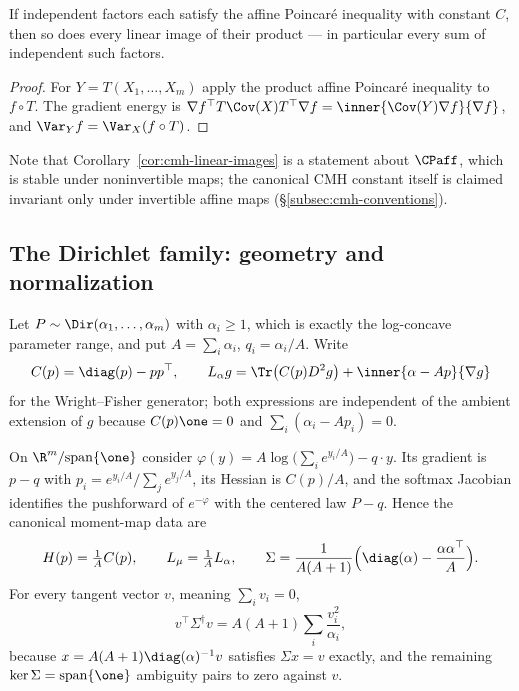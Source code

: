 \documentclass[../../main.tex]{subfiles}
\begin{document}
\begin{corollary}
\label{cor:cmh-linear-images}
If independent factors each satisfy the affine Poincar\'e inequality with constant $C$, then so
does every linear image of their product --- in particular every sum of independent such
factors.
\end{corollary}

\begin{proof}
For $Y=T(X_1,\dots,X_m)$ apply the product affine Poincar\'e inequality to $f\circ T$. The
gradient energy is $\nabla f^\top T\Cov(X)T^\top\nabla f=\inner{\Cov(Y)\nabla f}{\nabla f}$, and
$\Var_Yf=\Var_X(f\circ T)$.
\end{proof}

Note that Corollary~\ref{cor:cmh-linear-images} is a statement about $\CPaff$, which is stable
under noninvertible maps; the canonical CMH constant itself is claimed invariant only under
invertible affine maps (\S\ref{subsec:cmh-conventions}).

\subsection{The Dirichlet family: geometry and normalization}
\label{subsec:cmh-dirichlet-setup}

Let $P\sim\Dir(\alpha_1,\dots,\alpha_m)$ with $\alpha_i\ge1$, which is exactly the log-concave
parameter range, and put $A=\sum_i\alpha_i$, $q_i=\alpha_i/A$. Write
\begin{equation}
  C(p)=\diag(p)-pp^\top,
  \qquad
  L_\alpha g=\Tr\bigl(C(p)D^2g\bigr)+\inner{\alpha-Ap}{\nabla g}
  \label{eq:cmh-wright-fisher}
\end{equation}
for the Wright--Fisher generator; both expressions are independent of the ambient extension of
$g$ because $C(p)\one=0$ and $\sum_i(\alpha_i-Ap_i)=0$.

On $\R^m/\mathrm{span}\{\one\}$ consider
$\varphi(y)=A\log\bigl(\sum_ie^{y_i/A}\bigr)-q\cdot y$. Its gradient is $p-q$ with
$p_i=e^{y_i/A}/\sum_je^{y_j/A}$, its Hessian is $C(p)/A$, and the softmax Jacobian identifies
the pushforward of $e^{-\varphi}$ with the centered law $P-q$. Hence the canonical moment-map
data are
\begin{equation}
  H(p)=\tfrac1AC(p),\qquad L_\mu=\tfrac1AL_\alpha,
  \qquad
  \Sigma=\frac1{A(A+1)}\Bigl(\diag(\alpha)-\frac{\alpha\alpha^\top}A\Bigr).
  \label{eq:cmh-dirichlet-data}
\end{equation}
For every tangent vector $v$, meaning $\sum_iv_i=0$,
\begin{equation}
  v^\top\Sigma^\dagger v=A(A+1)\sum_i\frac{v_i^2}{\alpha_i},
  \label{eq:cmh-dirichlet-pseudoinverse}
\end{equation}
because $x=A(A+1)\diag(\alpha)^{-1}v$ satisfies $\Sigma x=v$ exactly, and the remaining
$\ker\Sigma=\mathrm{span}\{\one\}$ ambiguity pairs to zero against $v$.
\end{document}
